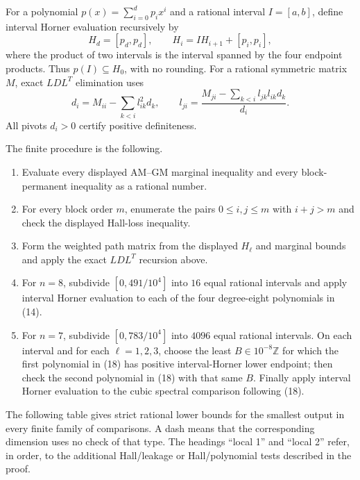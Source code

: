 \documentclass[10pt,a4paper]{amsart}
\theoremstyle{definition}
\theoremstyle{remark}
\begin{document}
For a polynomial \(p(x)=\sum_{i=0}^d p_ix^i\) and a rational interval
\(I=[a,b]\), define interval Horner evaluation recursively by
\[
 H_d=[p_d,p_d],\qquad H_i=I H_{i+1}+[p_i,p_i],
\]
where the product of two intervals is the interval spanned by the four
endpoint products.  Thus \(p(I)\subseteq H_0\), with no rounding.  For a
rational symmetric matrix \(M\), exact \(LDL^T\) elimination uses
\[
 d_i=M_{ii}-\sum_{k<i}l_{ik}^2d_k,\qquad
 l_{ji}=\frac{M_{ji}-\sum_{k<i}l_{jk}l_{ik}d_k}{d_i}.
\]
All pivots \(d_i>0\) certify positive definiteness.

The finite procedure is the following.

\begin{enumerate}
\item Evaluate every displayed AM--GM marginal inequality and every
  block-permanent inequality as a rational number.
\item For every block order \(m\), enumerate the pairs
  \(0\leq i,j\leq m\) with \(i+j>m\) and check the displayed Hall-loss
  inequality.
\item Form the weighted path matrix from the displayed \(H_\ell\) and
  marginal bounds and apply the exact \(LDL^T\) recursion above.
\item For \(n=8\), subdivide
  \([0,491/10^4]\) into \(16\) equal rational intervals and apply interval
  Horner evaluation to each of the four degree-eight polynomials in
  (14).
\item For \(n=7\), subdivide
  \([0,783/10^4]\) into \(4096\) equal rational intervals.  On each
  interval and for each \(\ell=1,2,3\), choose the least
  \(B\in10^{-8}\mathbb Z\) for which the first polynomial in (18) has
  positive interval-Horner lower endpoint; then check the second
  polynomial in (18) with that same \(B\).  Finally apply interval Horner
  evaluation to the cubic spectral comparison following (18).
\end{enumerate}

The following table gives strict rational lower bounds for the smallest
output in every finite family of comparisons.  A dash means that the
corresponding dimension uses no check of that type.  The headings ``local
1'' and ``local 2'' refer, in order, to the additional Hall/leakage or
Hall/polynomial tests described in the proof.
\end{document}
